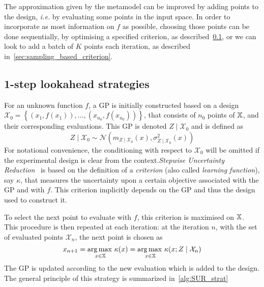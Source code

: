 \documentclass[../../Main_ManuscritThese.tex]{subfiles}
\begin{document}
The approximation given by the metamodel can be improved by adding
points to the design, \emph{i.e.} by evaluating some points in the
input space. In order to incorporate as most information on $f$ as
possible, choosing those points can be done sequentially, by
optimising a specified criterion, as described~\cref{ssec:1stepSUR},
or we can look to add a batch of $K$ points each iteration, as
described in~\cref{sec:sampling_based_criterion}.




\subsection{1-step lookahead strategies}
\label{ssec:1stepSUR}
For an unknown function $f$, a GP is initially constructed based on a
design
$\mathcal{X}_0 = \left\{\left(x_1,f(x_1)\right), \dots, \left(x_{n_0},
    f(x_{n_0})\right)\right\}$, that consists of $n_0$ points of
$\mathbb{X}$, and their corresponding evaluations. This GP is denoted
$Z \mid \mathcal{X}_0$ and is defined as
\begin{equation}
  \label{eq:ZgivenXGP}
  Z\mid \mathcal{X}_0 \sim \mathcal{N}(m_{Z\mid\mathcal{X}_0}(x),\sigma^2_{Z\mid\mathcal{X}_0}(x))
\end{equation}
For notational convenience, the conditioning with respect to
$\mathcal{X}_0$ will be omitted if the experimental design is clear
from the context.\emph{Stepwise Uncertainty
  Reduction}~\citep{villemonteix_informational_2006} is based on the
definition of a \emph{criterion} (also called \emph{learning
  function}), say $\kappa$, that measures the uncertainty upon a
certain objective associated with the GP and with $f$. This criterion
implicitly depends on the GP and thus the design used to construct it.

To select the next point to evaluate with $f$, this criterion is maximised on $\mathbb{X}$.
This procedure is then repeated at each iteration: at the iteration $n$, with the set of evaluated points $\mathcal{X}_n$, the next point is chosen as
\begin{equation}
  x_{n+1} = \operatorname*{arg\,max \,}_{x\in\mathbb{X}} \kappa(x) = \operatorname*{arg\,max \,}_{x\in\mathbb{X}} \kappa(x; Z \mid \mathcal{X}_n)
\end{equation}
The GP is updated according to the new evaluation which is added to the design. The general principle of this strategy is summarized in~\cref{alg:SUR_strat}
\end{document}
